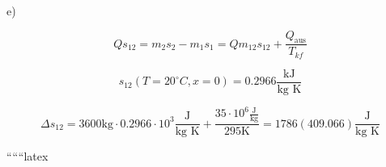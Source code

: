 e)

\[
Q s_{12} = m_2 s_2 - m_1 s_1 = Q m_{12} s_{12} + \frac{Q_{\text{aus}}}{T_{kf}}
\]

\[
s_{12} (T = 20^\circ C, x = 0) = 0.2966 \frac{\text{kJ}}{\text{kg K}}
\]

\[
\Delta s_{12} = 3600 \text{kg} \cdot 0.2966 \cdot 10^3 \frac{\text{J}}{\text{kg K}} + \frac{35 \cdot 10^6 \frac{\text{J}}{\text{kg}}}{295 \text{K}} = 1786 (409.066) \frac{\text{J}}{\text{kg K}}
\]

``````latex